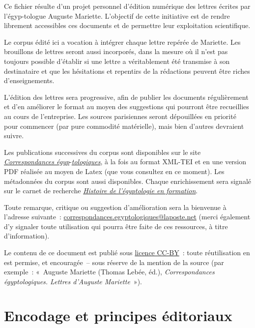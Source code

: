 \documentclass{book}
\begin{document}
Ce fichier résulte d’un projet personnel d’édition numérique des lettres écrites par l’égyp-tologue Auguste Mariette. L’objectif de cette initiative est de rendre librement accessibles ces documents et de permettre leur exploitation scientifique.
\par Le corpus édité ici a vocation à intégrer chaque lettre repérée de Mariette. Les brouillons de lettres seront aussi incorporés, dans la mesure où il n’est pas toujours possible d’établir si une lettre a véritablement été transmise à son destinataire et que les hésitations et repentirs de la rédactions peuvent être riches d’enseignements.
\par L’édition des lettres sera progressive, afin de publier les documents régulièrement et d’en améliorer le format au moyen des suggestions qui pourront être recueillies au cours de l’entreprise. Les sources parisiennes seront dépouillées en priorité pour commencer (par pure commodité matérielle), mais bien d’autres devraient suivre.
\par Les publications successives du corpus sont disponibles sur le site \href{https://thlebee.github.io/CoEg/}{\textit{Correspondances égyp}}-\href{https://thlebee.github.io/CoEg/}{\textit{tologiques}}, à la fois au format XML-TEI et en une version PDF réalisée au moyen de Latex (que vous consultez en ce moment). Les métadonnées du corpus sont aussi disponibles. Chaque enrichissement sera signalé sur le carnet de recherche \href{https://hef.hypotheses.org/}{\textit{Histoire de l’égyptologie en formation}}.
\par Toute remarque, critique ou suggestion d’amélioration sera la bienvenue à l’adresse suivante~: \href{mailto:correspondances.egyptologiques@laposte.net}{correspondances.egyptologiques@laposte.net} (merci également d’y signaler toute utilisation qui pourra être faite de ces ressources, à titre d’information).
\par Le contenu de ce document est publié sous \href{https://creativecommons.org/licenses/by/4.0}{licence CC-BY}~: toute réutilisation en est permise, et encouragée~– sous réserve de la mention de la source (par exemple~: «~Auguste Mariette (Thomas Lebée, éd.), \textit{Correspondances égyptologiques. Lettres d’Auguste Mariette}~»).

\section*{Encodage et principes éditoriaux}
\end{document}
